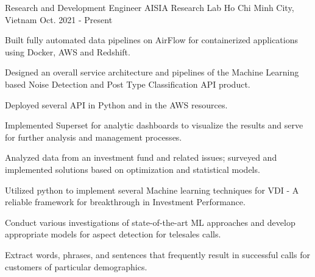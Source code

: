 \begin{cventries}
  \cventry
    {Research and Development Engineer} %
    {AISIA Research Lab} %
    {Ho Chi Minh City, Vietnam} %
    {Oct. 2021 - Present} %
    {
      \begin{cvitems} %
        \item {Built fully automated data pipelines on AirFlow for containerized applications using Docker, AWS and Redshift.}
        \item {Designed an overall service architecture and pipelines of the Machine Learning based Noise Detection and Post Type Classification API product.}
        \item {Deployed several API in Python and in the AWS resources.}
        \item {Implemented Superset for analytic dashboards to visualize the results and serve for further analysis and management processes.}
        \item {Analyzed data from an investment fund and related issues; surveyed and implemented solutions based on optimization and statistical models.}
        \item {Utilized python to implement several Machine learning techniques for VDI - A reliable framework for breakthrough in Investment Performance.}
        \item {Conduct various investigations of state-of-the-art ML approaches and develop appropriate models for aspect detection for telesales calls.}
        \item {Extract words, phrases, and sentences that frequently result in successful calls for customers of particular demographics.}
      \end{cvitems}
    }


\end{cventries}
